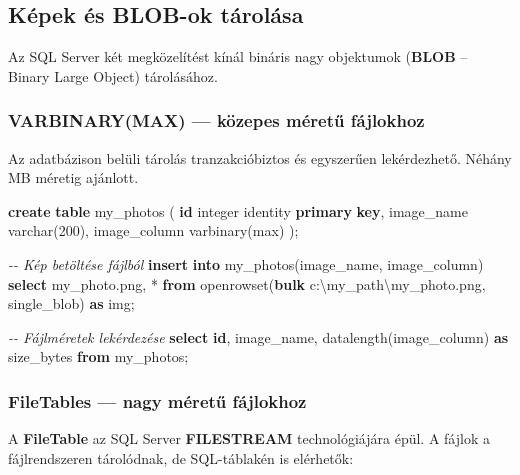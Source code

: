 \documentclass[
  magyar,
]{article}
\newenvironment{Shaded}{}{}
\newcommand{\CommentTok}[1]{\textcolor[rgb]{0.38,0.63,0.69}{\textit{#1}}}
\newcommand{\DataTypeTok}[1]{\textcolor[rgb]{0.56,0.13,0.00}{#1}}
\newcommand{\DecValTok}[1]{\textcolor[rgb]{0.25,0.63,0.44}{#1}}
\newcommand{\FunctionTok}[1]{\textcolor[rgb]{0.02,0.16,0.49}{#1}}
\newcommand{\KeywordTok}[1]{\textcolor[rgb]{0.00,0.44,0.13}{\textbf{#1}}}
\newcommand{\NormalTok}[1]{#1}
\newcommand{\OperatorTok}[1]{\textcolor[rgb]{0.40,0.40,0.40}{#1}}
\newcommand{\StringTok}[1]{\textcolor[rgb]{0.25,0.44,0.63}{#1}}
\begin{document}
\subsection{Képek és BLOB-ok
tárolása}\label{kuxe9pek-uxe9s-blob-ok-tuxe1roluxe1sa}

Az SQL Server két megközelítést kínál bináris nagy objektumok
(\textbf{BLOB} -- Binary Large Object) tárolásához.

\subsubsection{VARBINARY(MAX) --- közepes méretű
fájlokhoz}\label{varbinarymax-kuxf6zepes-muxe9retux171-fuxe1jlokhoz}

Az adatbázison belüli tárolás tranzakcióbiztos és egyszerűen
lekérdezhető. Néhány MB méretig ajánlott.

\begin{Shaded}
\begin{Highlighting}[]
\KeywordTok{create} \KeywordTok{table}\NormalTok{ my\_photos (}
 \KeywordTok{id} \DataTypeTok{integer}\NormalTok{ identity }\KeywordTok{primary} \KeywordTok{key}\NormalTok{,}
\NormalTok{ image\_name }\DataTypeTok{varchar}\NormalTok{(}\DecValTok{200}\NormalTok{),}
\NormalTok{ image\_column varbinary(}\FunctionTok{max}\NormalTok{)}
\NormalTok{);}

\CommentTok{{-}{-} Kép betöltése fájlból}
\KeywordTok{insert} \KeywordTok{into}\NormalTok{ my\_photos(image\_name, image\_column)}
\KeywordTok{select} \StringTok{\textquotesingle{}my\_photo.png\textquotesingle{}}\NormalTok{, }\OperatorTok{*} \KeywordTok{from}\NormalTok{ openrowset(}\KeywordTok{bulk} \StringTok{\textquotesingle{}c:\textbackslash{}my\_path\textbackslash{}my\_photo.png\textquotesingle{}}\NormalTok{, single\_blob) }\KeywordTok{as}\NormalTok{ img;}

\CommentTok{{-}{-} Fájlméretek lekérdezése}
\KeywordTok{select} \KeywordTok{id}\NormalTok{, image\_name, datalength(image\_column) }\KeywordTok{as}\NormalTok{ size\_bytes }\KeywordTok{from}\NormalTok{ my\_photos;}
\end{Highlighting}
\end{Shaded}

\subsubsection{FileTables --- nagy méretű
fájlokhoz}\label{filetables-nagy-muxe9retux171-fuxe1jlokhoz}

A \textbf{FileTable} az SQL Server \textbf{FILESTREAM} technológiájára
épül. A fájlok a fájlrendszeren tárolódnak, de SQL-táblakén is
elérhetők:
\end{document}
